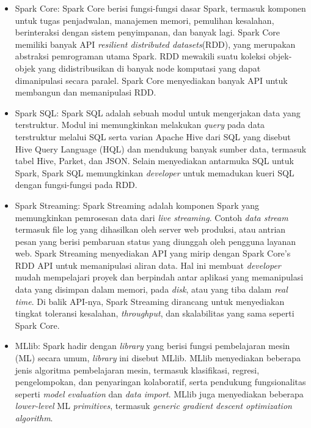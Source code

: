 \begin{itemize}

\item Spark Core:
Spark Core berisi fungsi-fungsi dasar Spark, termasuk komponen untuk tugas penjadwalan, manajemen memori, pemulihan kesalahan, berinteraksi dengan sistem penyimpanan,
dan banyak lagi. Spark Core memiliki banyak API \textit{resilient distributed datasets}(RDD), yang merupakan abstraksi pemrograman utama Spark. RDD mewakili suatu koleksi objek-objek yang didistribusikan di banyak node komputasi yang dapat dimanipulasi
secara paralel. Spark Core menyediakan banyak API untuk membangun dan memanipulasi RDD.

\item Spark SQL: Spark SQL adalah sebuah modul untuk mengerjakan data yang terstruktur. Modul ini memungkinkan melakukan \textit{query} pada data terstruktur melalui SQL serta varian Apache Hive dari SQL yang disebut Hive Query Language (HQL) dan mendukung banyak sumber data, termasuk tabel Hive, Parket, dan JSON. Selain menyediakan antarmuka SQL untuk Spark, Spark SQL memungkinkan \textit{developer} untuk memadukan kueri SQL dengan fungsi-fungsi pada RDD. 

\item Spark Streaming: Spark Streaming adalah komponen Spark yang memungkinkan pemrosesan data dari \textit{live streaming}. Contoh \textit{data stream} termasuk file log yang dihasilkan oleh server web produksi, atau antrian pesan yang berisi pembaruan status yang diunggah oleh pengguna layanan web. Spark Streaming menyediakan API yang mirip dengan  Spark Core's RDD API untuk memanipulasi aliran data. Hal ini membuat \textit{developer} mudah mempelajari proyek dan berpindah antar aplikasi yang memanipulasi data yang disimpan dalam memori, pada \textit{disk}, atau yang tiba dalam \textit{real time}. Di balik API-nya, Spark Streaming dirancang untuk menyediakan tingkat toleransi kesalahan, \textit{throughput}, dan skalabilitas yang sama seperti Spark Core.

\item MLlib: Spark hadir dengan \textit{library} yang berisi fungsi pembelajaran mesin (ML) secara umum, \textit{library} ini disebut MLlib. MLlib menyediakan beberapa jenis algoritma pembelajaran mesin, termasuk klasifikasi, regresi, pengelompokan, dan penyaringan kolaboratif, serta pendukung
fungsionalitas seperti \textit{model evaluation} dan \textit{data import}. MLlib juga menyediakan
beberapa \textit{lower-level} ML \textit{primitives}, termasuk \textit{generic gradient descent optimization
algorithm}.


\end{itemize}
